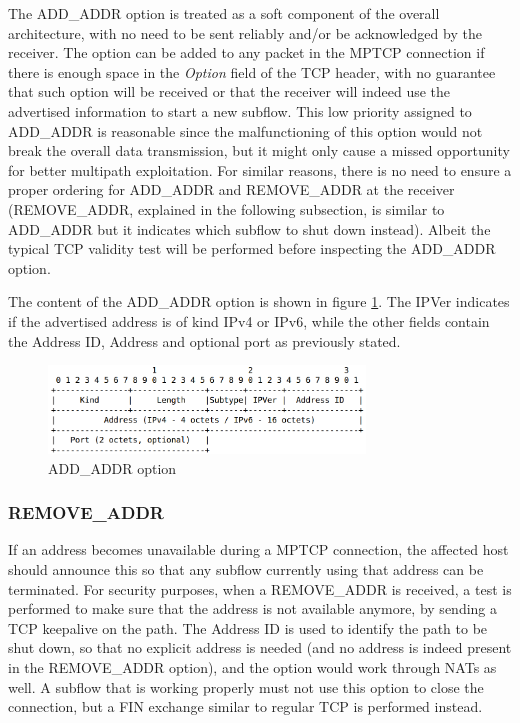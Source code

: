 The ADD\_ADDR option is treated as a soft component of the overall architecture, with no need to be sent reliably and/or be acknowledged by the receiver. The option can be added to any packet in the MPTCP connection if there is enough space in the \textit{Option} field of the TCP header, with no guarantee that such option will be received or that the receiver will indeed use the advertised information to start a new subflow. This low priority assigned to ADD\_ADDR is reasonable since the malfunctioning of this option would not break the overall data transmission, but it might only cause a missed opportunity for better multipath exploitation. For similar reasons, there is no need to ensure a proper ordering for ADD\_ADDR and REMOVE\_ADDR at the receiver (REMOVE\_ADDR, explained in the following subsection, is similar to ADD\_ADDR but it indicates which subflow to shut down instead). Albeit the typical TCP validity test will be performed before inspecting the ADD\_ADDR option.

The content of the ADD\_ADDR option is shown in figure \ref{fig:addaddropt}. The IPVer indicates if the advertised address is of kind IPv4 or IPv6, while the other fields contain the Address ID, Address and optional port as previously stated.

\begin{figure}[!htb]
\centering
\includegraphics[width=0.75\textwidth]{images/addaddropt}
\caption{ADD\_ADDR option}
\label{fig:addaddropt}
\end{figure}

\subsubsection{REMOVE\_ADDR}
If an address becomes unavailable during a MPTCP connection, the affected host should announce this so that any subflow currently using that address can be terminated. For security purposes, when a REMOVE\_ADDR is received, a test is performed to make sure that the address is not available anymore, by sending a TCP keepalive on the path.
The Address ID is used to identify the path to be shut down, so that no explicit address is needed (and no address is indeed present in the REMOVE\_ADDR option), and the option would work through NATs as well. 
A subflow that is working properly must not use this option to close the connection, but a FIN exchange similar to regular TCP is performed instead.

